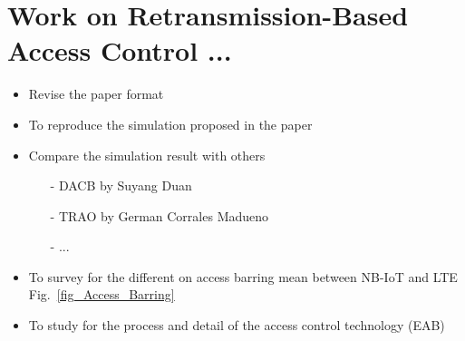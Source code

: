 \section{Work on Retransmission-Based Access Control ...}
\label{Retransmission-Based}
    \begin{itemize}
        \item {Revise the paper format}
        \item {To reproduce the simulation proposed in the paper}
        \item {Compare the simulation result with others}
        \begin{itemize}    
            \item[-]{DACB by Suyang Duan}
            \item[-]{TRAO by German Corrales Madueno}
            \item[-]{...}
        \end{itemize}
        \item {To survey for the different on access barring mean between NB-IoT and LTE}  Fig.~\ref{fig_Access_Barring}
        \item {To study for the process and detail of the access control technology (EAB)}
    \end{itemize}
    